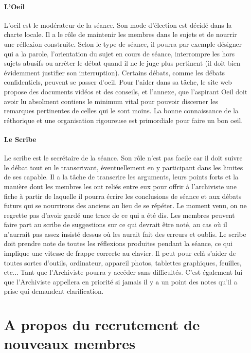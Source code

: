 \documentclass[a4paper,12pt]{article}
\begin{document}
\paragraph{L'Oeil}
L'oeil est le modérateur de la séance. Son mode d'élection est décidé dans la charte locale. Il a le rôle de maintenir les membres dans le sujets et de nourrir une réflexion construite. Selon le type de séance, il pourra par exemple désigner qui a la parole, l'orientation du sujet en cours de séance, interrompre les hors sujets abusifs ou arrêter le débat quand il ne le juge plus pertinent (il doit bien évidemment justifier son interruption). Certains débats, comme les débats confidentiels, peuvent se passer d'oeil. Pour l'aider dans sa tâche, le site web propose des documents vidéos et des conseils, et l'annexe, que l'aspirant Oeil doit avoir lu absolment contiens le minimum vital pour pouvoir discerner les remarques pertinentes de celles qui le sont moins. La bonne connaissance de la réthorique et une organisation rigoureuse est primordiale pour faire un bon oeil. 

\paragraph{Le Scribe}
Le scribe est le secrétaire de la séance. Son rôle n'est pas facile car il doit suivre le débat tout en le transcrivant, éventuellement en y participant dans les limites de ses capable. Il a la tâche de transcrire les arguments, leurs points forts et la manière dont les membres les ont reliés entre eux pour offrir à l'archiviste une fiche à partir de laquelle il pourra écrire les conclusions de séance et aux débats futurs qui se nourrirons des anciens au lieu de se répéter. Le moment venu, on ne regrette pas d'avoir gardé une trace de ce qui a été dis. Les membres peuvent faire part au scribe de suggestions sur ce qui devrait être noté, au cas où il n'aurrait pas assez insisté dessus où les aurait fait des erreurs et oublis. Le scribe doit prendre note de toutes les réflexions produites pendant la séance, ce qui implique une vitesse de frappe correcte au clavier. Il peut pour celà s'aider de toutes sortes d'outils, ordinateur, appareil photos, tablettes graphiques, feuilles, etc... Tant que l'Archiviste pourra y accéder sans difficultés. C'est également lui que l'Archiviste appellera en priorité si jamais il y a un point des notes qu'il a prise qui demandent clarification.

\section{A propos du recrutement de nouveaux membres}
\end{document}
